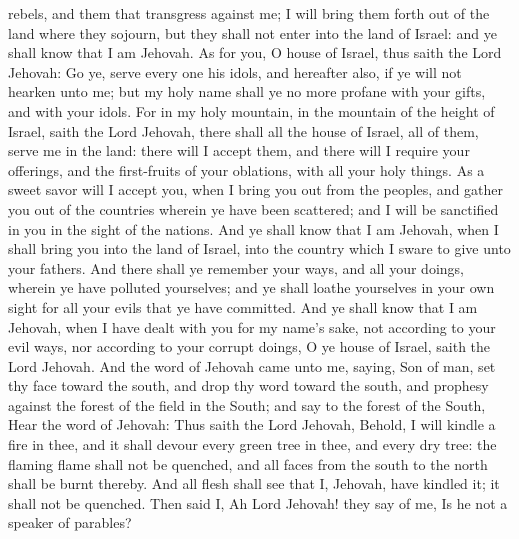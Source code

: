 rebels, and them that transgress against me; I will bring them forth out of the land where they sojourn, but they shall not enter into the land of Israel: and ye shall know that I am Jehovah. As for you, O house of Israel, thus saith the Lord Jehovah: Go ye, serve every one his idols, and hereafter also, if ye will not hearken unto me; but my holy name shall ye no more profane with your gifts, and with your idols.  For in my holy mountain, in the mountain of the height of Israel, saith the Lord Jehovah, there shall all the house of Israel, all of them, serve me in the land: there will I accept them, and there will I require your offerings, and the first-fruits of your oblations, with all your holy things. As a sweet savor will I accept you, when I bring you out from the peoples, and gather you out of the countries wherein ye have been scattered; and I will be sanctified in you in the sight of the nations. And ye shall know that I am Jehovah, when I shall bring you into the land of Israel, into the country which I sware to give unto your fathers. And there shall ye remember your ways, and all your doings, wherein ye have polluted yourselves; and ye shall loathe yourselves in your own sight for all your evils that ye have committed. And ye shall know that I am Jehovah, when I have dealt with you for my name’s sake, not according to your evil ways, nor according to your corrupt doings, O ye house of Israel, saith the Lord Jehovah.  And the word of Jehovah came unto me, saying, Son of man, set thy face toward the south, and drop thy word toward the south, and prophesy against the forest of the field in the South; and say to the forest of the South, Hear the word of Jehovah: Thus saith the Lord Jehovah, Behold, I will kindle a fire in thee, and it shall devour every green tree in thee, and every dry tree: the flaming flame shall not be quenched, and all faces from the south to the north shall be burnt thereby. And all flesh shall see that I, Jehovah, have kindled it; it shall not be quenched. Then said I, Ah Lord Jehovah! they say of me, Is he not a speaker of parables? 

